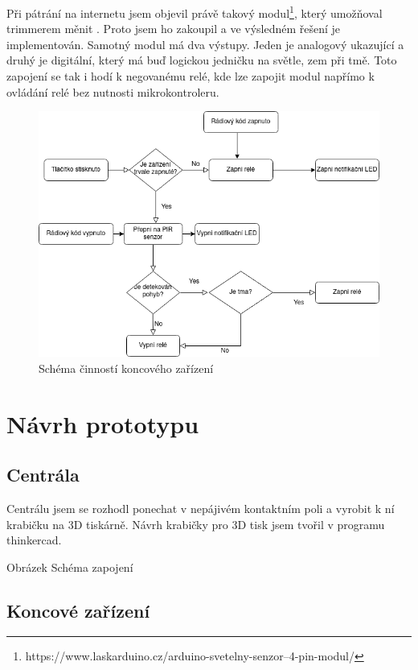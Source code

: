\documentclass[11pt,a4paper,twoside,openright]{report}
\begin{document}
Při pátrání na internetu jsem objevil právě takový modul\footnote{https://www.laskarduino.cz/arduino-svetelny-senzor--4-pin-modul/}, který umožňoval trimmerem měnit . Proto jsem ho zakoupil a ve výsledném řešení je implementován. Samotný modul má dva výstupy. Jeden je analogový ukazující  a druhý je digitální, který má buď logickou jedničku na světle, zem při tmě. Toto zapojení se tak i hodí k negovanému relé, kde lze zapojit modul napřímo k ovládání relé bez nutnosti mikrokontroleru.
\begin{figure}[htb]
\centering
\includegraphics[width=1\hsize]{img/schema_koncove_zarizeni.png}
\caption{Schéma činností koncového zařízení}\end{figure}

\section{Návrh prototypu}
\subsection{Centrála}

Centrálu jsem se rozhodl ponechat v nepájivém kontaktním poli a vyrobit k ní krabičku na 3D tiskárně. Návrh krabičky pro 3D tisk jsem tvořil v programu thinkercad. 

Obrázek Schéma zapojení

\subsection{Koncové zařízení}
\end{document}
